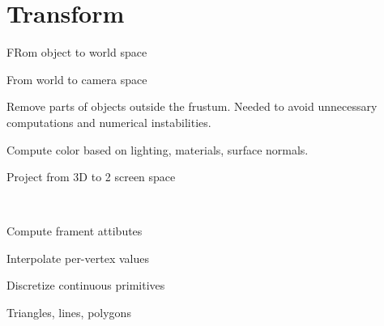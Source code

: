 \section{Transform}
\begin{compactdesc}
	\item[\lp{Modeling Transform}] FRom object to world space
	\item[\lp{Viewing Transform}] From world to camera space
	\item[\lp{3D Clipping}] Remove parts of objects outside the frustum. Needed to avoid unnecessary computations and numerical instabilities.
	\item[\lp{Lighting, Shading, Texturing}] Compute color based on lighting, materials, surface normals.
	\item[\lp{Projection to Screen Space}] Project from 3D to 2 screen space
	\item[\lp{Scan Conversion}] \hfill\\
		\begin{enumerate*}[label=\protect\circled{\arabic*},itemjoin=]
			\item Compute frament attibutes\\
			\item  Interpolate per-vertex values\\
			\item Discretize continuous primitives\\
			\item Triangles, lines, polygons
		\end{enumerate*}

\end{compactdesc}
